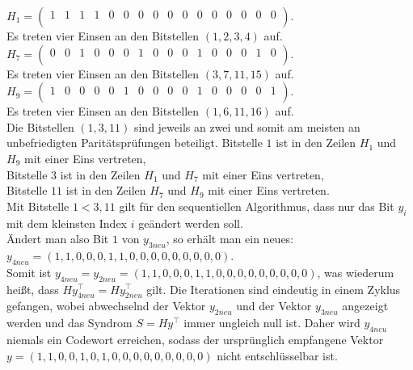 \begin{Beispiel}
    $H_1= \left( \begin{array}{rrrrrrrrrrrrrrrr}
        1 & 1 & 1 & 1 & 0 & 0 & 0 & 0 & 0 & 0 & 0 & 0 & 0 & 0 & 0 & 0 \\
       \end{array}\right). 
    $\\
    Es treten vier Einsen an den Bitstellen $(1, 2, 3, 4)$ auf.\\
    
    $H_7= \left( \begin{array}{rrrrrrrrrrrrrrrr}
        0 & 0 & 1 & 0 & 0 & 0 & 1 & 0 & 0 & 0 & 1 & 0 & 0 & 0 & 1 & 0 \\
       \end{array}\right). 
    $\\
    Es treten vier Einsen an den Bitstellen $(3, 7, 11, 15)$ auf.\\
    
    $H_9= \left( \begin{array}{rrrrrrrrrrrrrrrr}
        1 & 0 & 0 & 0 & 0 & 1 & 0 & 0 & 0 & 0 & 1 & 0 & 0 & 0 & 0 & 1 \\
       \end{array}\right). 
    $\\
    Es treten vier Einsen an den Bitstellen $(1, 6, 11, 16)$ auf.\\
    
    Die Bitstellen $(1, 3, 11)$ sind jeweils an zwei und somit am meisten an unbefriedigten Paritätsprüfungen beteiligt.
    Bitstelle $1$ ist in den Zeilen $H_1$ und $H_9$ mit einer Eins vertreten,\\
    Bitstelle $3$ ist in den Zeilen $H_1$ und $H_7$ mit einer Eins vertreten,\\
    Bitstelle $11$ ist in den Zeilen $H_7$ und $H_9$ mit einer Eins vertreten.\\
    Mit Bitstelle $1 < 3, 11$ gilt für den sequentiellen Algorithmus, dass nur das Bit $y_i$ mit dem kleinsten Index $i$ geändert werden soll.\\
    
    Ändert man also Bit $1$ von $y_{3neu}$, so erhält man ein neues:\\
    $y_{4neu} = (1,1,0,0,0,1,1,0,0,0,0,0,0,0,0,0).$\\
    
    Somit ist $y_{4neu} = y_{2neu} = (1,1,0,0,0,1,1,0,0,0,0,0,0,0,0,0)$, was wiederum hei\ss{}t, dass $Hy_{4neu}^\intercal= Hy_{2neu}^\intercal$ gilt.
    Die Iterationen sind eindeutig in einem Zyklus gefangen, wobei abwechselnd der Vektor $y_{2neu}$ und der Vektor $y_{3neu}$ angezeigt werden und das Syndrom $S= Hy^\intercal$ immer ungleich null ist.
    Daher wird $y_{4neu}$ niemals ein Codewort erreichen, sodass der ursprünglich empfangene Vektor $y = (1,1,0,0,1,0,1,0,0,0,0,0,0,0,0,0)$ nicht entschlüsselbar ist.\\
    

\end{Beispiel}

